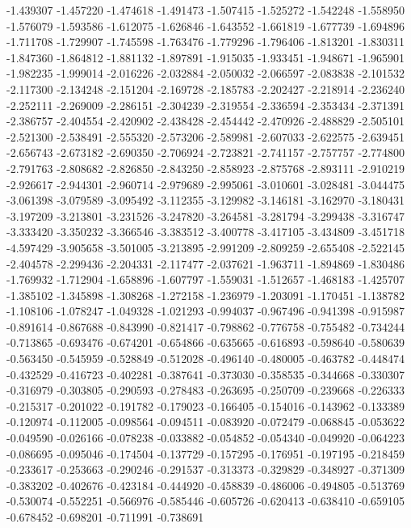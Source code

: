 -1.439307
-1.457220
-1.474618
-1.491473
-1.507415
-1.525272
-1.542248
-1.558950
-1.576079
-1.593586
-1.612075
-1.626846
-1.643552
-1.661819
-1.677739
-1.694896
-1.711708
-1.729907
-1.745598
-1.763476
-1.779296
-1.796406
-1.813201
-1.830311
-1.847360
-1.864812
-1.881132
-1.897891
-1.915035
-1.933451
-1.948671
-1.965901
-1.982235
-1.999014
-2.016226
-2.032884
-2.050032
-2.066597
-2.083838
-2.101532
-2.117300
-2.134248
-2.151204
-2.169728
-2.185783
-2.202427
-2.218914
-2.236240
-2.252111
-2.269009
-2.286151
-2.304239
-2.319554
-2.336594
-2.353434
-2.371391
-2.386757
-2.404554
-2.420902
-2.438428
-2.454442
-2.470926
-2.488829
-2.505101
-2.521300
-2.538491
-2.555320
-2.573206
-2.589981
-2.607033
-2.622575
-2.639451
-2.656743
-2.673182
-2.690350
-2.706924
-2.723821
-2.741157
-2.757757
-2.774800
-2.791763
-2.808682
-2.826850
-2.843250
-2.858923
-2.875768
-2.893111
-2.910219
-2.926617
-2.944301
-2.960714
-2.979689
-2.995061
-3.010601
-3.028481
-3.044475
-3.061398
-3.079589
-3.095492
-3.112355
-3.129982
-3.146181
-3.162970
-3.180431
-3.197209
-3.213801
-3.231526
-3.247820
-3.264581
-3.281794
-3.299438
-3.316747
-3.333420
-3.350232
-3.366546
-3.383512
-3.400778
-3.417105
-3.434809
-3.451718
-4.597429
-3.905658
-3.501005
-3.213895
-2.991209
-2.809259
-2.655408
-2.522145
-2.404578
-2.299436
-2.204331
-2.117477
-2.037621
-1.963711
-1.894869
-1.830486
-1.769932
-1.712904
-1.658896
-1.607797
-1.559031
-1.512657
-1.468183
-1.425707
-1.385102
-1.345898
-1.308268
-1.272158
-1.236979
-1.203091
-1.170451
-1.138782
-1.108106
-1.078247
-1.049328
-1.021293
-0.994037
-0.967496
-0.941398
-0.915987
-0.891614
-0.867688
-0.843990
-0.821417
-0.798862
-0.776758
-0.755482
-0.734244
-0.713865
-0.693476
-0.674201
-0.654866
-0.635665
-0.616893
-0.598640
-0.580639
-0.563450
-0.545959
-0.528849
-0.512028
-0.496140
-0.480005
-0.463782
-0.448474
-0.432529
-0.416723
-0.402281
-0.387641
-0.373030
-0.358535
-0.344668
-0.330307
-0.316979
-0.303805
-0.290593
-0.278483
-0.263695
-0.250709
-0.239668
-0.226333
-0.215317
-0.201022
-0.191782
-0.179023
-0.166405
-0.154016
-0.143962
-0.133389
-0.120974
-0.112005
-0.098564
-0.094511
-0.083920
-0.072479
-0.068845
-0.053622
-0.049590
-0.026166
-0.078238
-0.033882
-0.054852
-0.054340
-0.049920
-0.064223
-0.086695
-0.095046
-0.174504
-0.137729
-0.157295
-0.176951
-0.197195
-0.218459
-0.233617
-0.253663
-0.290246
-0.291537
-0.313373
-0.329829
-0.348927
-0.371309
-0.383202
-0.402676
-0.423184
-0.444920
-0.458839
-0.486006
-0.494805
-0.513769
-0.530074
-0.552251
-0.566976
-0.585446
-0.605726
-0.620413
-0.638410
-0.659105
-0.678452
-0.698201
-0.711991
-0.738691

